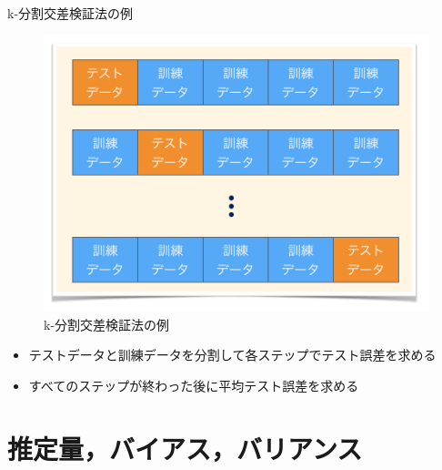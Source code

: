 \documentclass[dvipdfmx, 10pt]{beamer}
\begin{document}

\begin{frame}{k-分割交差検証法の例}
  \begin{figure}[htbp]
     \includegraphics[width=0.6\linewidth]{./images/k-fold.png}
     \caption{k-分割交差検証法の例}
  \end{figure}
  \begin{itemize}
    \item テストデータと訓練データを分割して各ステップでテスト誤差を求める
    \item すべてのステップが終わった後に平均テスト誤差を求める
  \end{itemize}
\end{frame}


\section{推定量，バイアス，バリアンス}

\end{document}
